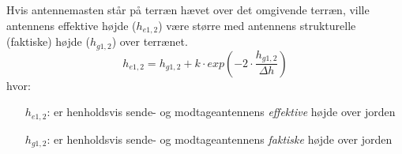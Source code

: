 Hvis antennemasten står på terræn hævet over det omgivende terræn, ville antennens effektive højde ($h_{e1,2}$) være større med antennens strukturelle (faktiske) højde ($h_{g1,2}$) over terrænet.  
\begin{equation}
h_{e1,2} = h_{g1,2} + k \cdot exp(-2 \cdot \frac{h_{g1,2}}{\Delta h})
\end{equation}
hvor:
\begin{itemize}
	\item [$h_{e1,2}$:] er henholdsvis sende- og modtageantennens \emph{effektive} højde over jorden 
	\item [$h_{g1,2}$:] er henholdsvis sende- og modtageantennens \emph{faktiske} højde over jorden 
\end{itemize}
\FloatBarrier